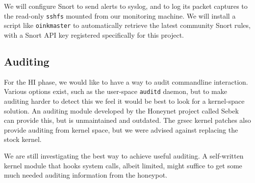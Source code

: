 \documentclass[11pt]{article} %
\begin{document}
We will configure Snort to send alerts to syslog, and to log its packet captures to the read-only \verb|sshfs| mounted from our monitoring machine.
We will install a script like \verb|oinkmaster| to automatically retrieve the latest community Snort rules, with a Snort API key registered specifically for this project.

\subsection{Auditing}
For the HI phase, we would like to have a way to audit commandline interaction. 
Various options exist, such as the user-space \verb|auditd| daemon, but to make auditing harder to detect this we feel it would be best to look for a kernel-space solution.
An auditing module developed by the Honeynet project called Sebek can provide this, but is unmaintained and outdated.
The grsec kernel patches also provide auditing from kernel space, but we were advised against replacing the stock kernel.

We are still investigating the best way to achieve useful auditing.
A self-written kernel module that hooks system calls, albeit limited, might suffice to get some much needed auditing information from the honeypot.




\end{document}
